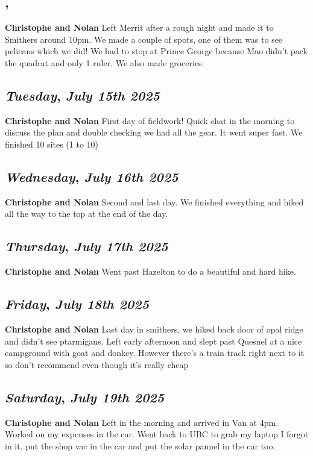 \subsection*{\weekday, \day}
\textbf {Christophe and Nolan}
Left Merrit after a rough night and made it to Smithers around 10pm. We made a couple of spots, one of them was to see pelicans which we did! We had to stop at Prince George because Mao didn't pack the quadrat and only 1 ruler. We also made groceries.

\def\day{\textit{July 15th 2025}}
\def\weekday{\textit{Tuesday}}
\subsection*{\weekday, \day}
\textbf {Christophe and Nolan}
First day of fieldwork! Quick chat in the morning to discuss the plan and double checking we had all the gear. It went super fast. We finished 10 sites (1 to 10)

\def\day{\textit{July 16th 2025}}
\def\weekday{\textit{Wednesday}}
\subsection*{\weekday, \day}
\textbf {Christophe and Nolan}
Second and last day. We finished everything and hiked all the way to the top at the end of the day.

\def\day{\textit{July 17th 2025}}
\def\weekday{\textit{Thursday}}
\subsection*{\weekday, \day}
\textbf {Christophe and Nolan}
Went past Hazelton to do a beautiful and hard hike.

\def\day{\textit{July 18th 2025}}
\def\weekday{\textit{Friday}}
\subsection*{\weekday, \day}
\textbf {Christophe and Nolan}
Last day in smithers, we hiked back door of opal ridge and didn't see ptarmigans. Left early afternoon and slept past Quesnel at a nice campground with goat and donkey. However there's a train track right next to it so don't recommend even though it's really cheap

\def\day{\textit{July 19th 2025}}
\def\weekday{\textit{Saturday}}
\subsection*{\weekday, \day}
\textbf {Christophe and Nolan}
Left in the morning and arrived in Van at 4pm. Worked on my expenses in the car. Went back to UBC to grab my laptop I forgot in it, put the shop vac in the car and put the solar pannel in the car too.

